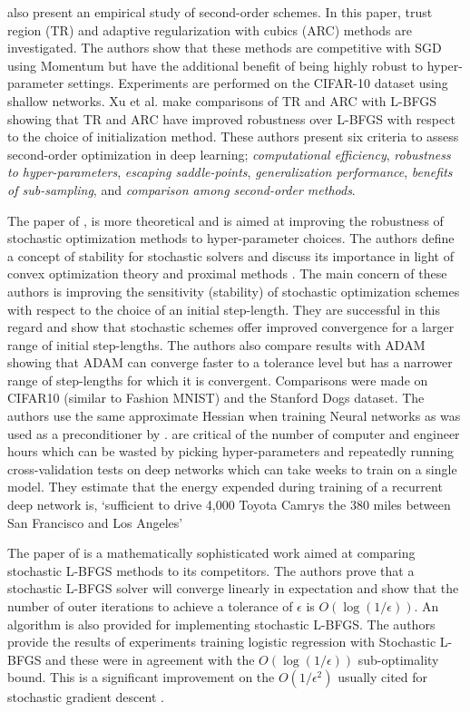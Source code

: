 \documentclass[nohyperref]{article}
\theoremstyle{plain}
\theoremstyle{definition}
\theoremstyle{remark}
\begin{document}
\citet{Xu:2ndNCML} also present an empirical study of second-order schemes. In this paper, trust region (TR) and adaptive regularization with cubics (ARC) methods are investigated. The authors show that these methods are competitive with SGD using Momentum but have the additional benefit of being highly robust to hyper-parameter settings. Experiments are performed on the CIFAR-10 dataset using shallow networks. Xu et al. make comparisons of TR and ARC with L-BFGS showing that TR and ARC have improved robustness over L-BFGS with respect to the  choice of initialization method. These authors present six criteria to assess second-order optimization in deep learning; \textit{computational efficiency}, \textit{robustness to hyper-parameters}, \textit{escaping saddle-points}, \textit{generalization performance}, \textit{benefits of sub-sampling}, and   \textit{comparison among second-order methods}.

The paper of \citet{Asi:BetterStoch}, is more theoretical and is aimed at improving the robustness of stochastic optimization methods to hyper-parameter choices. The authors define a concept of stability for stochastic solvers and discuss its importance in light of convex optimization theory and proximal methods \citep[see][]{Boyd:Vanden}. The main concern of these authors is improving the sensitivity (stability) of stochastic optimization schemes with respect to the choice of an initial step-length. They are successful in this regard and show that stochastic schemes offer improved convergence for a larger range of initial step-lengths. The authors also compare results with ADAM showing that ADAM can converge faster to a tolerance level but has a narrower range of step-lengths for which it is convergent. Comparisons were made on CIFAR10 (similar to Fashion MNIST) and the Stanford Dogs dataset. The authors use the same approximate Hessian when training Neural networks as was used as a preconditioner by \citet{Martens:Deep}.  \citet{Asi:BetterStoch} are critical of the number of computer and engineer hours which can be wasted by picking hyper-parameters and repeatedly running cross-validation tests on deep networks which can take weeks to train on a single model. They estimate that the energy expended during training of a recurrent deep network \cite{Collinsetal:RNN} is, `sufficient to drive 4,000 Toyota Camrys the 380 miles between San Francisco and Los Angeles'

The paper of \citet{Zhao:SLBFGS} is a mathematically sophisticated work aimed at comparing stochastic L-BFGS methods to its competitors. The authors prove that a stochastic L-BFGS solver will converge linearly in expectation and show that the number of outer iterations to achieve a tolerance of $\epsilon$ is $O(\log(1/\epsilon))$. An algorithm is also provided for implementing stochastic L-BFGS. The authors provide the results of experiments training logistic regression with Stochastic L-BFGS and these were in agreement with the  $O(\log(1/\epsilon))$ sub-optimality bound. This is a significant improvement on the $O(1/\epsilon^2)$ usually cited for stochastic gradient descent \citep[see][]{Srebro:StochOpt}.
\end{document}

